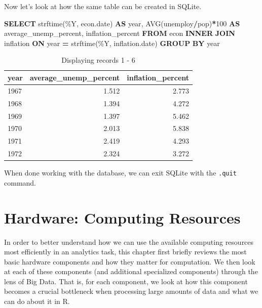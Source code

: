 \documentclass[
  12pt,
]{style/krantz}
\newenvironment{Shaded}{\begin{snugshade}}{\end{snugshade}}
\newcommand{\DataTypeTok}[1]{\textcolor[rgb]{0.13,0.29,0.53}{#1}}
\newcommand{\DecValTok}[1]{\textcolor[rgb]{0.00,0.00,0.81}{#1}}
\newcommand{\FunctionTok}[1]{\textcolor[rgb]{0.00,0.00,0.00}{#1}}
\newcommand{\KeywordTok}[1]{\textcolor[rgb]{0.13,0.29,0.53}{\textbf{#1}}}
\newcommand{\NormalTok}[1]{#1}
\newcommand{\OperatorTok}[1]{\textcolor[rgb]{0.81,0.36,0.00}{\textbf{#1}}}
\newcommand{\StringTok}[1]{\textcolor[rgb]{0.31,0.60,0.02}{#1}}
\begin{document}
Now let's look at how the same table can be created in SQLite.

\begin{Shaded}
\begin{Highlighting}[]
\KeywordTok{SELECT} 
\NormalTok{strftime(}\StringTok{\textquotesingle{}\%Y\textquotesingle{}}\NormalTok{, econ.}\DataTypeTok{date}\NormalTok{)  }\KeywordTok{AS} \DataTypeTok{year}\NormalTok{,}
\FunctionTok{AVG}\NormalTok{(unemploy}\OperatorTok{/}\NormalTok{pop)}\OperatorTok{*}\DecValTok{100} \KeywordTok{AS}\NormalTok{ average\_unemp\_percent,}
\NormalTok{inflation\_percent}
\KeywordTok{FROM}\NormalTok{ econ }\KeywordTok{INNER} \KeywordTok{JOIN}\NormalTok{ inflation }\KeywordTok{ON} \DataTypeTok{year} \OperatorTok{=}\NormalTok{ strftime(}\StringTok{\textquotesingle{}\%Y\textquotesingle{}}\NormalTok{, inflation.}\DataTypeTok{date}\NormalTok{)}
\KeywordTok{GROUP} \KeywordTok{BY} \DataTypeTok{year}
\end{Highlighting}
\end{Shaded}

\begin{table}

\caption{\label{tab:unnamed-chunk-67}Displaying records 1 - 6}
\centering
\begin{tabular}[t]{l|r|r}
\hline
year & average\_unemp\_percent & inflation\_percent\\
\hline
1967 & 1.512 & 2.773\\
\hline
1968 & 1.394 & 4.272\\
\hline
1969 & 1.397 & 5.462\\
\hline
1970 & 2.013 & 5.838\\
\hline
1971 & 2.419 & 4.293\\
\hline
1972 & 2.324 & 3.272\\
\hline
\end{tabular}
\end{table}

When done working with the database, we can exit SQLite with the \texttt{.quit} command.

\hypertarget{hardware-computing-resources}{%
\chapter{Hardware: Computing Resources}\label{hardware-computing-resources}}

In order to better understand how we can use the available computing resources most efficiently in an analytics task, this chapter first briefly reviews the most basic hardware components and how they matter for computation. We then look at each of these components (and additional specialized components) through the lens of Big Data. That is, for each component, we look at how this component becomes a crucial bottleneck when processing large amounts of data and what we can do about it in R.
\end{document}
